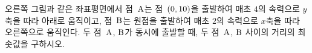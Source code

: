 \noindent\begin{minipage}[t]{0.58\linewidth}\vspace{0pt}\raggedright 오른쪽 그림과 같은 좌표평면에서 점~$\mathrm{A}$는 점~$(0{,}\mkern3mu\mathopen{}10)$을 출발하여 매초 $4$의 속력으로 $y$축을 따라 아래로 움직이고, 점~$\mathrm{B}$는 원점을 출발하여 매초 $2$의 속력으로 $x$축을 따라 오른쪽으로 움직인다. 두 점~$\mathrm{A}$, $\mathrm{B}$가 동시에 출발할 때, 두 점~$\mathrm{A}$, $\mathrm{B}$ 사이의 거리의 최솟값을 구하시오.\end{minipage}\hfill\begin{minipage}[t]{0.4\linewidth}\vspace{0pt}\centering \resizebox{\ifdim\width>\linewidth\linewidth\else\width\fi}{!}{}\end{minipage}\par

